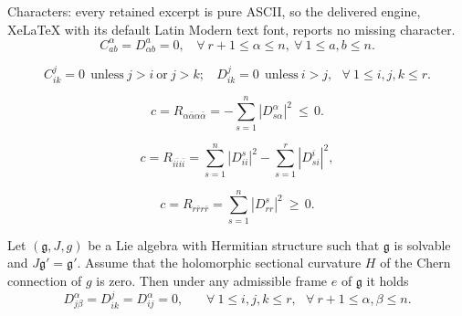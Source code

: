 \documentclass[10pt,a4paper]{amsart}
\begin{document}
Characters: every retained excerpt is pure ASCII, so the delivered engine, XeLaTeX with its default Latin Modern text font, reports no missing character.
\begin{equation}  \label{eq:res1}
C^{\alpha}_{ab}=D^{a}_{\alpha b}=0, \ \ \ \ \forall \ r\!+\!1\leq \alpha \leq n, \ \forall \ 1\leq a,b\leq n. 
\end{equation}

\begin{equation}  \label{eq:res2}
C^j_{ik}=0  \ \  \mbox{unless} \ j>i \ \mbox{or} \ j>k; \ \ \ \ D^j_{ik}=0 \  \ \mbox{unless} \ i>j, \ \ \ \forall \ 1\leq i,j,k\leq r.
\end{equation}

\begin{equation} \label{eq:alpha}
 c=R_{\alpha \bar{\alpha} \alpha \bar{\alpha} } = - \sum_{s=1}^n |D^{\alpha }_{s\alpha}|^2 \ \leq \,0. 
 \end{equation}

\begin{equation}  \label{eq:i}
 c=R_{i \bar{i} i \bar{i} } =  \sum_{s=1}^n |D^s_{ii}|^2 - \sum_{s=1}^r |D^{i}_{si}|^2 ,
 \end{equation}

\begin{equation}  \label{eq:r}
 c=R_{r \bar{r} r \bar{r} } =  \sum_{s=1}^n |D^s_{rr}|^2 \ \geq \, 0. 
 \end{equation}

\begin{lemma} \label{lemmagoal}
Let $({\mathfrak g},J,g)$ be a Lie algebra with Hermitian structure such that ${\mathfrak g}$ is solvable and  $J{\mathfrak g}'={\mathfrak g}'$. Assume that the holomorphic sectional curvature $H$ of the Chern connection of $g$ is zero. Then under any admissible frame $e$ of ${\mathfrak g}$ it holds
\begin{equation}  \label{eq:goal}
D^{\alpha}_{j\beta}=D^j_{ik}=D^{\alpha}_{ij}=0,  \ \ \ \ \ \ \ \ \forall\ 1\leq i,j,k\leq r, \ \ \ \forall \ r\!+\!1\leq \alpha , \beta \leq n. 
 \end{equation}
\end{lemma}
\end{document}
